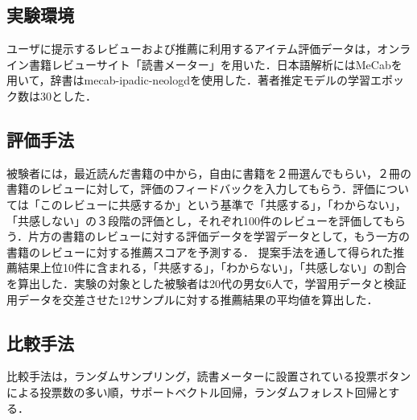 \documentclass[a4paper,11pt,oneside,openany]{jsbook}
\begin{document}
		\subsection{実験環境}
ユーザに提示するレビューおよび推薦に利用するアイテム評価データは，オンライン書籍レビューサイト「読書メーター」を用いた．日本語解析にはMeCab\cite{mecab}を用いて，辞書はmecab-ipadic-neologd\cite{mecabdic}を使用した．著者推定モデルの学習エポック数は30とした．

		\subsection{評価手法}
被験者には，最近読んだ書籍の中から，自由に書籍を２冊選んでもらい，２冊の書籍のレビューに対して，評価のフィードバックを入力してもらう．評価については「このレビューに共感するか」という基準で「共感する」，「わからない」，「共感しない」の３段階の評価とし，それぞれ100件のレビューを評価してもらう．片方の書籍のレビューに対する評価データを学習データとして，もう一方の書籍のレビューに対する推薦スコアを予測する．
提案手法を通して得られた推薦結果上位10件に含まれる，「共感する」，「わからない」，「共感しない」の割合を算出した．実験の対象とした被験者は20代の男女6人で，学習用データと検証用データを交差させた12サンプルに対する推薦結果の平均値を算出した．

\subsection{比較手法}
比較手法は，ランダムサンプリング，読書メーターに設置されている投票ボタンによる投票数の多い順，サポートベクトル回帰，ランダムフォレスト回帰とする．
\end{document}
